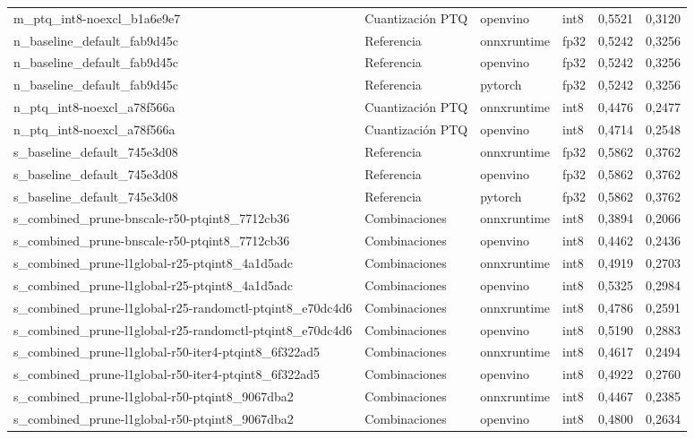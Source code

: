 \begin{landscape}
\begin{table}[htbp]
\begin{adjustbox}{max width=\linewidth, max totalheight=\dimexpr\textheight-\ht\tfmedgetitle-\dp\tfmedgetitle-\ht\tfmedgenotes-\dp\tfmedgenotes-6pt\relax}
\begin{tabular}{llllrr}
    m\_ptq\_int8-noexcl\_b1a6e9e7 & Cuantización PTQ & openvino & int8 & 0,5521 & 0,3120 \\
    n\_baseline\_default\_fab9d45c & Referencia & onnxruntime & fp32 & 0,5242 & 0,3256 \\
    n\_baseline\_default\_fab9d45c & Referencia & openvino & fp32 & 0,5242 & 0,3256 \\
    n\_baseline\_default\_fab9d45c & Referencia & pytorch & fp32 & 0,5242 & 0,3256 \\
    n\_ptq\_int8-noexcl\_a78f566a & Cuantización PTQ & onnxruntime & int8 & 0,4476 & 0,2477 \\
    n\_ptq\_int8-noexcl\_a78f566a & Cuantización PTQ & openvino & int8 & 0,4714 & 0,2548 \\
    s\_baseline\_default\_745e3d08 & Referencia & onnxruntime & fp32 & 0,5862 & 0,3762 \\
    s\_baseline\_default\_745e3d08 & Referencia & openvino & fp32 & 0,5862 & 0,3762 \\
    s\_baseline\_default\_745e3d08 & Referencia & pytorch & fp32 & 0,5862 & 0,3762 \\
    s\_combined\_prune-bnscale-r50-ptqint8\_7712cb36 & Combinaciones & onnxruntime & int8 & 0,3894 & 0,2066 \\
    s\_combined\_prune-bnscale-r50-ptqint8\_7712cb36 & Combinaciones & openvino & int8 & 0,4462 & 0,2436 \\
    s\_combined\_prune-l1global-r25-ptqint8\_4a1d5adc & Combinaciones & onnxruntime & int8 & 0,4919 & 0,2703 \\
    s\_combined\_prune-l1global-r25-ptqint8\_4a1d5adc & Combinaciones & openvino & int8 & 0,5325 & 0,2984 \\
    s\_combined\_prune-l1global-r25-randomctl-ptqint8\_e70dc4d6 & Combinaciones & onnxruntime & int8 & 0,4786 & 0,2591 \\
    s\_combined\_prune-l1global-r25-randomctl-ptqint8\_e70dc4d6 & Combinaciones & openvino & int8 & 0,5190 & 0,2883 \\
    s\_combined\_prune-l1global-r50-iter4-ptqint8\_6f322ad5 & Combinaciones & onnxruntime & int8 & 0,4617 & 0,2494 \\
    s\_combined\_prune-l1global-r50-iter4-ptqint8\_6f322ad5 & Combinaciones & openvino & int8 & 0,4922 & 0,2760 \\
    s\_combined\_prune-l1global-r50-ptqint8\_9067dba2 & Combinaciones & onnxruntime & int8 & 0,4467 & 0,2385 \\
    s\_combined\_prune-l1global-r50-ptqint8\_9067dba2 & Combinaciones & openvino & int8 & 0,4800 & 0,2634 \\

\end{tabular}
\end{adjustbox}
\end{table}
\end{landscape}
